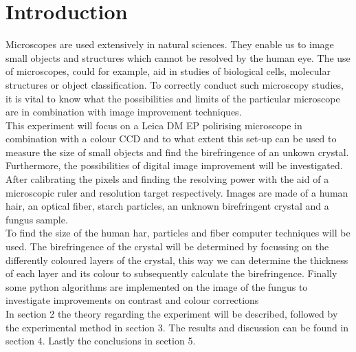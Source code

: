 \section{Introduction}
Microscopes are used extensively in natural sciences. They enable us to image small objects and structures which cannot be resolved by the human eye. The use of microscopes, could for example, aid in studies of biological cells, molecular structures or object classification. To correctly conduct such microscopy studies, it is vital to know what the possibilities and limits of the particular microscope are in combination with image improvement techniques.\\
This experiment will focus on a Leica DM EP polirising microscope in combination with a colour CCD and to what extent this set-up can be used to measure the size of small objects and find the birefringence of an unkown crystal. Furthermore, the possibilities of digital image improvement will be investigated.\\
After calibrating the pixels and finding the resolving power with the aid of a microscopic ruler and resolution target respectively. Images are made of a human hair, an optical fiber, starch particles, an unknown birefringent crystal and a fungus sample.\\
To find the size of the human har, particles and fiber computer techniques will be used. The birefringence of the crystal will be determined by focussing on the differently coloured layers of the crystal, this way we can determine the thickness of each layer and its colour to subsequently calculate the birefringence. Finally some python algorithms are implemented on the image of the fungus to investigate improvements on contrast and colour corrections\\
In section 2 the theory regarding the experiment will be described, followed by the experimental method in section 3. The results and discussion can be found in section 4. Lastly the conclusions in section 5.









\begin{comment}
    TheInleiding ( Introduction) describes:   -The  research  question.  (Be  as  precise  as  possible.  Not:  “We  investigate  on  which  parameters  the  bubble  behaviour  depends”,  but  “we  study  the  relationship  between  the  path  of  bubbles  at  a  microfluidic T-junction, and the velocity and length of those bubbles).\\-The relevance of the research question (for science and/or technology).\\-The state-of-art: what is already know? (including references to prior literature).\\-A brief description of the research method/approach.\\-A brief description of the structure/contents of the rest of the report.\\The  introduction  should  be  self-contained,  without  reference  to  the  manual  or  to  the  remainder  of  the  report, and should be understandable to readers who know nothing about the research.
\end{comment}